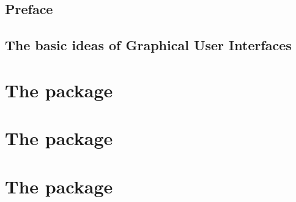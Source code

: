 \documentclass[showtrims]{memoir}
\begin{document}
\thispagestyle{empty}


\frontmatter

\chapter*{Preface}
\label{chap:preface}

\newpage



\setcounter{tocdepth}{3}
\tableofcontents
\newpage



\graphicspath{
  {ch-Preface/}
  {ch-GUIBasics/}
  {ch-ProgrammingPractices/}
  {ch-gWidgets/}
  {ch-RGtk2/}
  {ch-Qt/}
  {ch-tcltk/}
}


\mainmatter
\chapter{The basic ideas of Graphical User Interfaces}
\label{chap:GUIBasics}






\part{The  package}
\label{chap:gWidgets-intro}



\part{The  package}
\label{chap:RGtk2}


\part{The  package}
\label{chap:Qt}

\end{document}
